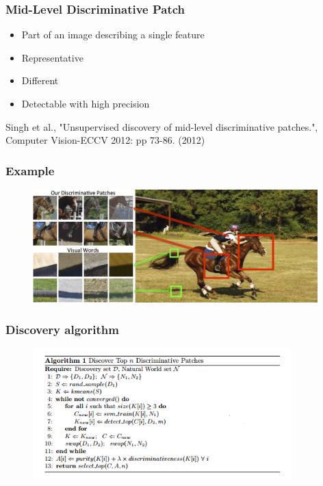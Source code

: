 \documentclass[serif,14pt]{beamer}
\begin{document}
\begin{frame}
  \frametitle{Mid-Level Discriminative Patch}

  \begin{itemize}
      \item  Part of an image describing a single feature
      \item Representative
      \item Different
      \item Detectable with high precision
  \end{itemize} 

  \vspace*{1.5cm}
  \small
  Singh et al., "Unsupervised discovery of mid-level discriminative patches.", Computer Vision-ECCV 2012: pp 73-86. (2012)

\end{frame}


\begin{frame}
  \frametitle{Example}
  \begin{figure}[t]
    \centering
    \includegraphics[width=11cm]{patches.jpg}
  \end{figure}
\end{frame}

\begin{frame}
  \frametitle{Discovery algorithm}
  \begin{figure}[t]
    \centering
    \includegraphics[width=10cm]{algorithm.png}
  \end{figure}
\end{frame}
\end{document}
